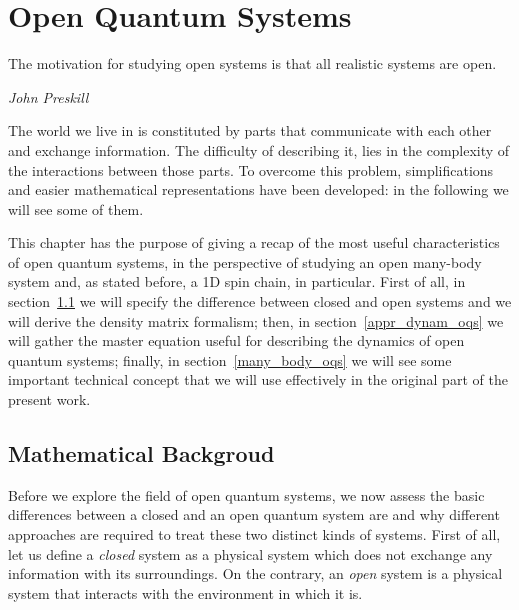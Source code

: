 \chapter{Open Quantum Systems}
\label{Chapter1}
\epigraph{The motivation for studying open systems is that all realistic systems are open.}{\textit{John Preskill}}

\newcommand{\keyword}[1]{\textbf{#1}}
\newcommand{\tabhead}[1]{\textbf{#1}}
\newcommand{\code}[1]{\texttt{#1}}
\newcommand{\file}[1]{\texttt{\bfseries#1}}
\newcommand{\option}[1]{\texttt{\itshape#1}}

The world we live in is constituted by parts that communicate with each other and exchange information. The difficulty of describing it, lies in the complexity of the interactions between those parts. To overcome this problem, simplifications and easier mathematical representations have been developed: in the following we will see some of them.

This chapter has the purpose of giving a recap of the most useful characteristics of open quantum systems, in the perspective of studying an open many-body system and, as stated before, a 1D spin chain, in particular. First of all, in section~\ref{cl_open_qs} we will specify the difference between closed and open systems and we will derive the density matrix formalism; then, in section~\ref{appr_dynam_oqs} we will gather the master equation useful for describing the dynamics of open quantum systems; finally, in section~\ref{many_body_oqs} we will see some important technical concept that we will use effectively in the original part of the present work.


\section{Mathematical Backgroud}
\label{cl_open_qs}
Before we explore the field of open quantum systems, we now assess the basic differences between a closed and an open quantum system are and why different approaches are required to treat these two distinct kinds of systems. First of all, let us define a \emph{closed} system as a physical system which does not exchange any information with its surroundings. On the contrary, an \emph{open} system is a physical system that interacts with the environment in which it is. 

